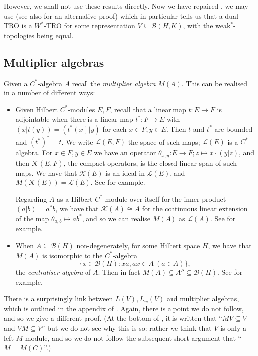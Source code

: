 \documentclass[a4paper,11pt]{article}
\theoremstyle{plain}
\theoremstyle{remark}
\newcommand{\mc}[1]{\mathcal{#1}}
\begin{document}
However, we shall not use these results directly.  Now we have repaired \cite[Proposition~2.4]{EOR_InjectivityNuclearityOS}, we may use \cite[Theorem~2.6]{EOR_InjectivityNuclearityOS} (see also \cite[Corollary~3.5]{BM_Duality_OpAlgI} for an alternative proof) which in particular tells us that a dual TRO is a $W^*$-TRO for some representation $V \subseteq \mc B(H,K)$, with the weak$^*$-topologies being equal.


\subsection{Multiplier algebras}\label{sec:mults}

Given a $C^*$-algebra $A$ recall the \emph{multiplier algebra} $M(A)$.  This can be realised in a number of different ways:
\begin{itemize}
  \item Given Hilbert $C^*$-modules $E,F$, recall that a linear map $t\colon E\to F$ is adjointable when there is a linear map $t^* \colon F \to E$ with $(x|t(y)) = (t^*(x)|y)$ for each $x\in F, y\in E$.  Then $t$ and $t^*$ are bounded and $(t^*)^*=t$.  We write $\mc L(E,F)$ the space of such maps; $\mc L(E)$ is a $C^*$-algebra.  For $x\in F,y\in E$ we have an operator $\theta_{x,y} \colon E\to F; z\mapsto x \cdot (y|z)$, and then $\mc K(E,F)$, the compact operators, is the closed linear span of such maps.  We have that $\mc K(E)$ is an ideal in $\mc L(E)$, and $M(\mc K(E)) = \mc L(E)$.  See \cite[Chapter~1]{Lance_HilbModsBook} for example.
  
  Regarding $A$ as a Hilbert $C^*$-module over itself for the inner product $(a|b) = a^*b$, we have that $\mc K(A)\cong A$ for the continuous linear extension of the map $\theta_{a,b} \mapsto ab^*$, and so we can realise $M(A)$ as $\mc L(A)$.  See \cite[Chapter~2]{Lance_HilbModsBook} for example.

  \item When $A \subseteq \mc B(H)$ non-degenerately, for some Hilbert space $H$, we have that $M(A)$ is isomorphic to the $C^*$-algebra
  \[ \bigl\{ x\in\mc B(H) : xa, ax\in A \ (a\in A) \bigr\}, \]
  the \emph{centraliser algebra} of $A$.  Then in fact $M(A) \subseteq A'' \subseteq \mc B(H)$.  See \cite[Proposition~3.12.3]{PedersenBook} for example.
\end{itemize}

There is a surprisingly link between $L(V), L_w(V)$ and multiplier algebras, which is outlined in the appendix of \cite{EOR_InjectivityNuclearityOS}.  Again, there is a point we do not follow, and so we give a different proof.  (At the bottom of \cite[page~517]{EOR_InjectivityNuclearityOS}, it is written that ``$MV\subseteq V$ and $VM\subseteq V$'' but we do not see why this is so: rather we think that $V$ is only a left $M$ module, and so we do not follow the subsequent short argument that ``$M=M(C)$''.)
\end{document}
